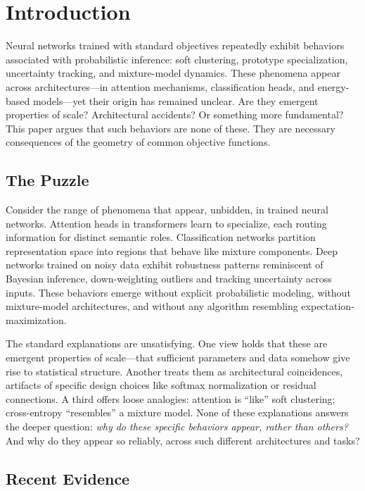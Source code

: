 \section{Introduction}

Neural networks trained with standard objectives repeatedly exhibit behaviors associated with probabilistic inference: soft clustering, prototype specialization, uncertainty tracking, and mixture-model dynamics. These phenomena appear across architectures---in attention mechanisms, classification heads, and energy-based models---yet their origin has remained unclear. Are they emergent properties of scale? Architectural accidents? Or something more fundamental? This paper argues that such behaviors are none of these. They are necessary consequences of the geometry of common objective functions.

\subsection{The Puzzle}

Consider the range of phenomena that appear, unbidden, in trained neural networks. Attention heads in transformers learn to specialize, each routing information for distinct semantic roles. Classification networks partition representation space into regions that behave like mixture components. Deep networks trained on noisy data exhibit robustness patterns reminiscent of Bayesian inference, down-weighting outliers and tracking uncertainty across inputs. These behaviors emerge without explicit probabilistic modeling, without mixture-model architectures, and without any algorithm resembling expectation-maximization.

The standard explanations are unsatisfying. One view holds that these are emergent properties of scale---that sufficient parameters and data somehow give rise to statistical structure. Another treats them as architectural coincidences, artifacts of specific design choices like softmax normalization or residual connections. A third offers loose analogies: attention is ``like'' soft clustering; cross-entropy ``resembles'' a mixture model. None of these explanations answers the deeper question: \emph{why do these specific behaviors appear, rather than others?} And why do they appear so reliably, across such different architectures and tasks?

\subsection{Recent Evidence}

